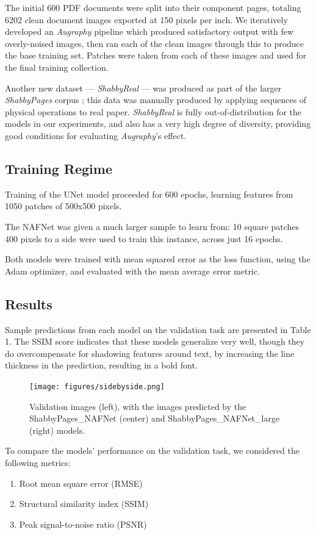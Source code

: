 \documentclass[runningheads]{llncs}
\begin{document}
The initial 600 PDF documents were split into their component pages, totaling 6202 clean document images exported at 150 pixels per inch.
We iteratively developed an \emph{Augraphy} pipeline which produced satisfactory output with few overly-noised images, then ran each of the clean images through this to produce the base training set.
Patches were taken from each of these images and used for the final training collection.

Another new dataset --- \emph{ShabbyReal} --- was produced as part of the larger \emph{ShabbyPages} corpus \cite{ref_ShabbyPages}; this data was manually produced by applying sequences of physical operations to real paper.  \emph{ShabbyReal} is fully out-of-distribution for the models in our experiments, and also has a very high degree of diversity, providing good conditions for evaluating \emph{Augraphy}'s effect.

\subsection{Training Regime}
Training of the UNet model proceeded for 600 epochs, learning features from 1050 patches of 500x500 pixels.

The NAFNet was given a much larger sample to learn from: 10 square patches 400 pixels to a side were used to train this instance, across just 16 epochs.

Both models were trained with mean squared error as the loss function, using the Adam optimizer, and evaluated with the mean average error metric.

\subsection{Results}
Sample predictions from each model on the validation task are presented in Table 1. The SSIM score indicates that these models generalize very well, though they do overcompensate for shadowing features around text, by increasing the line thickness in the prediction, resulting in a bold font.

\begin{figure}\label{fig4}
\texttt{[image: figures/sidebyside.png]}
\caption{Validation images (left), with the images predicted by the ShabbyPages_NAFNet (center) and ShabbyPages_NAFNet_large (right) models.}
\end{figure} %

To compare the models' performance on the validation task, we considered the following metrics:
\begin{enumerate}
\item Root mean square error (RMSE)
\item Structural similarity index (SSIM)
\item Peak signal-to-noise ratio (PSNR)
\end{enumerate}
\end{document}
